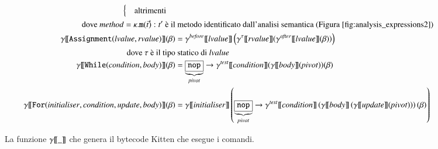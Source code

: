 \begin{figure}[t]
{\begin{align*}
\begin{cases}
    \quad\text{altrimenti}
  \end{cases} \\
  \text{dove $\mathit{method}=\kappa.\mathtt{m}(\vec{t}):t'$
        \`e il}&
  \text{ metodo identificato dall'analisi semantica
        (Figura~\ref{fig:analysis_expressions2})}\\
  \gen{\mathtt{Assignment(\mathit{lvalue},\mathit{rvalue})}}(\beta)&=
    \gamma^\mathit{before}\inter{\mathit{lvalue}}
    \left(\gentwo{\tau}{\mathit{rvalue}}
    (\gamma^\mathit{after}\inter{\mathit{lvalue}}(\beta))
    \right) \\
  \text{dove $\tau$ \`e il tipo}& \text{ statico di $\mathit{lvalue}$}\\
  \gen{\mathtt{While(\mathit{condition},\mathit{body})}}(\beta)&=
    \underbrace{\fbox{$\mathtt{nop}$}}_\mathit{pivot}
    \to\gentest{\mathit{condition}}(\gen{\mathit{body}}(\mathit{pivot}))
    (\beta)\\
  \gen{\mathtt{For(\mathit{initialiser},\mathit{condition},\mathit{update},
    \mathit{body})}}(\beta)&=
    \gen{\mathit{initialiser}}
    \left(\underbrace{\fbox{$\mathtt{nop}$}}_\mathit{pivot}\to
    \gentest{\mathit{condition}}\left(\gen{\mathit{body}}\left(
    \gen{\mathit{update}}(\mathit{pivot})
    \right)\right)(\beta)
    \right)
\end{align*}
}
\caption{La funzione ${\gamma[\![{\_}]\!]}$ che genera il bytecode Kitten che esegue i comandi.}
  \label{fig:commands_generation}
\end{figure}

